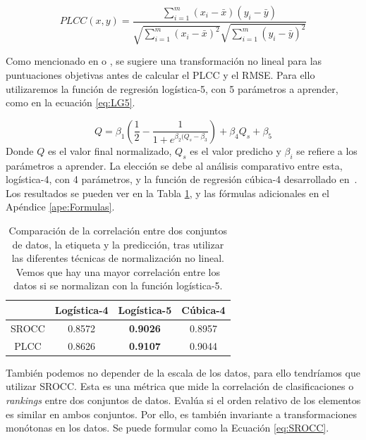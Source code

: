 \begin{equation}
  PLCC(x,y) = \frac{\sum_{i=1}^m (x_i - \bar x)(y_i - \bar y)}{\sqrt{\sum_{i=1}^m (x_i - \bar x)^2}\sqrt{\sum_{i=1}^m (y_i - \bar y)^2}}
\label{eq:PLCC}
\end{equation}

Como mencionado en \cite{ResSCNN} o \cite{VQA-PC}, se sugiere una transformación 
no lineal para las puntuaciones objetivas antes de calcular el PLCC y el RMSE.
Para ello utilizaremos la función de regresión logística-5, con 5 parámetros a aprender,
como en la ecuación \eqref{eq:LG5}. 

\begin{equation}
  Q = \beta_1 \left(\frac{1}{2} - \frac{1}{1+e^{\beta_2 (Q_s-\beta_3}} \right) + \beta_4 Q_s + \beta_5
  \label{eq:LG5}
\end{equation}
Donde $Q$ es el valor final normalizado, $Q_s$ es el valor predicho y $\beta_i$ se 
refiere a los parámetros a aprender.
La elección se debe al análisis comparativo entre esta, logística-4, con 4 parámetros, y la función de regresión cúbica-4
desarrollado en~\cite{ResSCNN}. Los resultados se pueden ver en la Tabla \ref{tab:CompareNonLineal}, 
y las fórmulas adicionales en el Apéndice \ref{ape:Formulas}.

\begin{table}[htp]
  \centering
  \scriptsize
  \begin{tabular}{|c|c|c|c|}
    \hline
    \rowcolor[HTML]{FFC702} 
    & \textbf{Logística-4} & \textbf{Logística-5} & \textbf{Cúbica-4} \\
    \hline 
    SROCC & 0.8572 & \textbf{0.9026} & 0.8957\\
    \hline
    PLCC & 0.8626 & \textbf{0.9107} & 0.9044 \\
    \hline 
  \end{tabular}
\caption[Comparativa entre funciones de normalización.]{Comparación de la correlación entre dos conjuntos de datos, la etiqueta y 
  la predicción, tras utilizar las diferentes técnicas de normalización no lineal. 
Vemos que hay una mayor correlación entre los datos si se normalizan con la 
función logística-5.}
  \label{tab:CompareNonLineal}
\end{table}
También podemos no depender de la escala de los datos, para ello tendríamos que 
utilizar SROCC.
Esta es una métrica que mide la correlación de clasificaciones o \emph{rankings} entre 
dos conjuntos de datos. Evalúa si el orden relativo de los elementos es similar 
en ambos conjuntos. Por ello, es también invariante a transformaciones monótonas 
en los datos. Se puede formular como la Ecuación \ref{eq:SROCC}.

